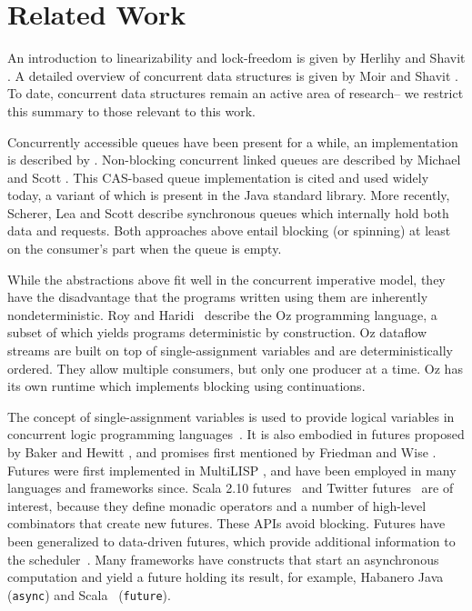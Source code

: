 \section{Related Work}

An introduction to linearizability and lock-freedom
is given by Herlihy and Shavit \cite{Herlihy08}.
A detailed overview of concurrent data structures is given
by Moir and Shavit \cite{Moir05}.
To date, concurrent data structures remain an active area of
research-- we restrict this summary to those relevant to this work.

Concurrently accessible queues have been present for a while,
an implementation is described by \cite{Mellor87}.
Non-blocking concurrent linked queues are described by Michael and
Scott \cite{Michael96}. This CAS-based
queue implementation is cited and used widely today, a variant of
which is present in the Java standard library.
More recently, Scherer, Lea and Scott \cite{SchererLS09} describe
synchronous queues which internally hold both data and requests.
Both approaches above entail blocking (or spinning) at least on the
consumer's part when the queue is empty.

While the abstractions above fit well in the concurrent imperative
model, they have the disadvantage that the programs written using them
are inherently nondeterministic.
Roy and Haridi~\cite{RoyH2004} describe the Oz programming language,
a subset of which yields programs deterministic by construction.
Oz dataflow streams are built on top of
single-assignment variables and are deterministically ordered.
They allow multiple consumers, but only one producer
at a time.
Oz has its own runtime which implements blocking using
continuations.

The concept of single-assignment variables is used to provide logical
variables in concurrent logic programming languages~\cite{Shapiro89}.
It is also embodied in
futures proposed by Baker and Hewitt \cite{Hewitt77}, and promises
first mentioned by Friedman and Wise \cite{Wise76}.
Futures were first implemented in MultiLISP \cite{Halstead85},
and have been employed in many languages and frameworks since.
Scala 2.10 futures~\cite{SIP14} and Twitter futures~\cite{TwitterFutures} are
of interest, because they define monadic operators and a
number of high-level combinators that create new futures.
These APIs avoid blocking.
Futures have been generalized to data-driven futures,
which provide additional information to the scheduler~\cite{Tasirlar11}.
Many frameworks have constructs that start an asynchronous
computation and yield a future holding its result, for example, Habanero Java~\cite{Shirako11} (\verb=async=)
and Scala~\cite{Odersky10} (\verb=future=).

